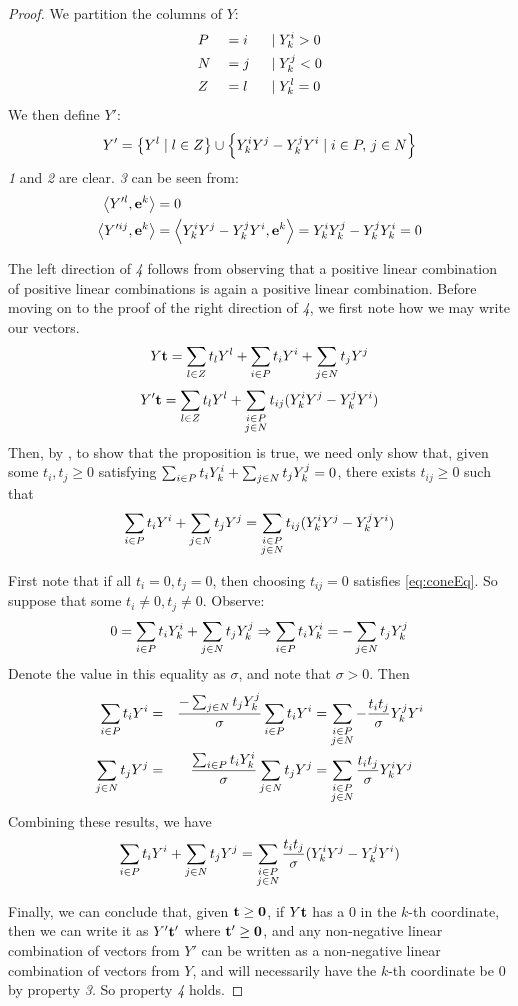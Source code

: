 \begin{proof}
	We partition the columns of $ Y$:
	\begin{alignat*}{3}
		 & P &  & = i \; & \;|\; & Y^i_{k} > 0 \\
		 & N &  & = j \; & \;|\; & Y^j_{k} < 0 \\
		 & Z &  & = l \; & \;|\; & Y^l_{k} = 0
	\end{alignat*}
	We then define $ Y'$:
	\[  Y' = \left\{ Y^l \;|\; l \in Z\right\} \cup
		\left\{Y^i_{k} Y^j - Y^j_{k} Y^i \;|\; i \in P,\, j\in N\right\} \]
	\textit{1} and \textit{2} are clear.  \textit{3} can be seen from:
	\begin{align}
		\left\langle Y'^l, \mathbf{e}^k \right\rangle    & = 0 \nonumber                                                                \\
		\left\langle Y'^{ij}, \mathbf{e}^k \right\rangle & = \left\langle Y^i_{k} Y^j - Y^j_{k} Y^i, \mathbf{e}^k \right\rangle = Y^i_{k} Y^j_{k} - Y^j_{k} Y^i_{k} = 0 \label{eq:hdropZrows}
	\end{align}

	The left direction of \textit{4} follows from observing that a positive linear combination of positive linear combinations is again a positive linear combination.  Before moving on to the proof of the right direction of \textit{4}, we first note how we may write our vectors.
	\[  Y\mathbf{t} = \sum_{l\in Z} t_l  Y^l + \sum_{i\in P} t_i  Y^i + \sum_{j\in N} t_j  Y^j \]
	\[  Y'\mathbf{t} = \sum_{l\in Z} t_l  Y^l + \sum_{\substack{i\in P \\ j\in N}} t_{ij} (Y^i_{k} Y^j - Y^j_{k} Y^i) \]
	Then, by , to show that the proposition is true, we need only show that, given some $t_i, t_j \geq 0$ satisfying $\sum_{i\in P} t_i  Y^i_{k} + \sum_{j\in N} t_j  Y^j_{k} = 0$, there exists $t_{ij} \geq 0$ such that
	\begin{equation} \label{eq:coneEq}
		 \sum_{i\in P} t_i  Y^i + \sum_{j\in N} t_j  Y^j = \sum_{\substack{i\in P \\ j\in N}} t_{ij} (Y^i_{k} Y^j - Y^j_{k} Y^i)
	\end{equation}

	\newcommand{\coneEqSat}{\quad\mathrm{\;such\; that\; \eqref{eq:coneEq}\; holds}}
		First note that if all $t_i = 0,t_j = 0$, then choosing $t_{ij} = 0$ satisfies \eqref{eq:coneEq}.  So suppose that some $t_i \neq 0, t_j \neq 0$.  Observe:
		\[ 0 = \sum_{i\in P} t_iY^i_{k} + \sum_{j\in N} t_jY^j_{k} \Rightarrow \sum_{i\in P} t_iY^i_{k} = -\sum_{j\in N} t_jY^j_{k}\]
		Denote the value in this equality as $\sigma$, and note that $\sigma > 0$.  Then
		\begin{alignat*}{3}
			\sum_{i\in P} t_i Y^i & = & \frac{-\sum_{j\in N} t_j Y^j_{k}}{\sigma}\sum_{i\in P} t_i Y^i & =
			\sum_{\substack{i\in P \\ j\in N}} -\frac{t_i t_j}{\sigma}Y^j_{k} Y^i                              \\
			\sum_{j\in N} t_j Y^j & = & \frac{\sum_{i\in P} t_i Y^i_{k}}{\sigma}\sum_{j\in N} t_j Y^j  & =
			\sum_{\substack{i\in P \\ j\in N}} \frac{t_i t_j}{\sigma}Y^i_{k} Y^j
		\end{alignat*}
		Combining these results, we have
		\[ \sum_{i\in P} t_i Y^i + \sum_{j\in N} t_j Y^j = \sum_{\substack{i\in P \\ j\in N}} \frac{t_i t_j}{\sigma}(Y^i_{k} Y^j - Y^j_{k} Y^i) \]

	Finally, we can conclude that, given $\mathbf{t} \geq \mathbf{0}$, if $Y\mathbf{t}$ has a $0$ in the $k$-th coordinate, then we can write it as $ Y'\mathbf{t}'$ where $\mathbf{t}' \geq \mathbf{0}$, and any non-negative linear combination of vectors from $Y'$ can be written as a non-negative linear combination of vectors from $Y$, and will necessarily have the $k$-th coordinate be $0$ by property \textit{3}.  So property \textit{4} holds.
\end{proof}

